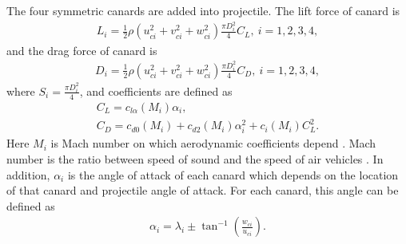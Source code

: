 \documentclass[letterpaper, 10 pt, conference]{ieeeconf}  %
\begin{document}
The four symmetric canards are added into projectile.  The lift force of canard is \cite{mccoy1999modern}
\begin{gather}
L_i=\frac{1}{2} \rho (u_{ci}^2+v_{ci}^2+w_{ci}^2)\frac{\pi D_i^2}{4} C_L, \ i={1,2,3,4},
\label{eqn:can1}
\end{gather}
and the drag force of canard is \cite{mccoy1999modern}
\begin{gather}
D_i=\frac{1}{2} \rho (u_{ci}^2+v_{ci}^2+w_{ci}^2)\frac{\pi D_i^2}{4} C_D, \ i={1,2,3,4},
\end{gather}
where $S_i=\frac{\pi D_i^2}{4}$, and coefficients are defined as \cite{costel97pot} 
\begin{gather}
C_L=c_{l \alpha}(M_i)\alpha_i, \\
C_D=c_{d 0}(M_i)+c_{d2} (M_i) \alpha_i^2 + c_i(M_i) C_L^2.
\end{gather}
Here $M_i$ is Mach number on which aerodynamic coefficients depend \cite{costel97pot}. Mach number is the ratio between speed of sound and the speed of air vehicles \cite{stengel2015flight}. In addition, $\alpha_i$ is the angle of attack of each canard which depends on the location of that canard and projectile angle of attack. For each canard, this angle can be defined as
\begin{gather}
\alpha_i=\lambda_i \pm \tan^{-1}(\frac{w_{ci}}{u_{ci}}).
\end{gather}
\end{document}
